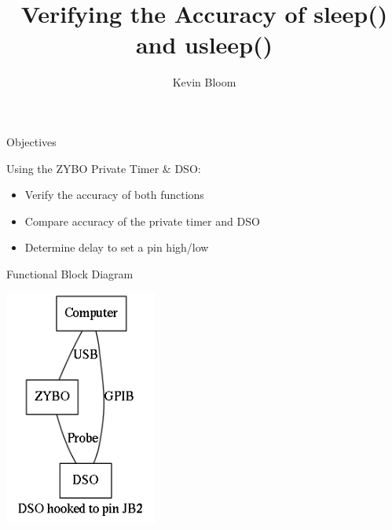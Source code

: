 \documentclass[pdf]{beamer}
\title{Verifying the Accuracy of sleep() and usleep()}
\author{Kevin Bloom}
\begin{document}

\begin{frame}

  \titlepage

\end{frame}


\begin{frame}{Objectives}


  Using the ZYBO Private Timer \& DSO:
  \pause
  \begin{itemize}

  \item Verify the accuracy of both functions

    \pause

  \item Compare accuracy of the private timer and DSO

    \pause

  \item Determine delay to set a pin high/low

  \end{itemize}
  

\end{frame}

\begin{frame}{Functional Block Diagram}

  \centering
  \includegraphics[width=50mm]{block-diagram.png}

\end{frame}
\end{document}
